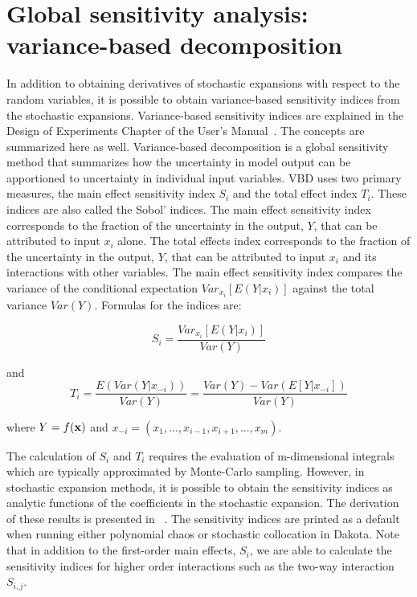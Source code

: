 \section{Global sensitivity analysis: variance-based decomposition}\label{uq:expansion:vbd}

In addition to obtaining derivatives of stochastic expansions with
respect to the random variables, it is possible to obtain
variance-based sensitivity indices from the stochastic expansions.
Variance-based sensitivity indices are explained in the Design of
Experiments Chapter of the User's Manual~\cite{UserMan}.  The concepts
are summarized here as well.  Variance-based decomposition is a global
sensitivity method that summarizes how the uncertainty in model output
can be apportioned to uncertainty in individual input variables.  VBD
uses two primary measures, the main effect sensitivity index $S_{i}$
and the total effect index $T_{i}$.  These indices are also called the
Sobol' indices. The main effect sensitivity index corresponds to the
fraction of the uncertainty in the output, $Y$, that can be attributed
to input $x_{i}$ alone.  The total effects index corresponds to the
fraction of the uncertainty in the output, $Y$, that can be attributed
to input $x_{i}$ and its interactions with other variables. The main
effect sensitivity index compares the variance of the conditional
expectation $Var_{x_{i}}[E(Y|x_{i})]$ against the total variance
$Var(Y)$.  Formulas for the indices are:

\begin{equation}
S_{i}=\frac{Var_{x_{i}}[E(Y|x_{i})]}{Var(Y)} \label{eq:sobol}
\end{equation}

and 
\begin{equation}
T_{i}=\frac{E(Var(Y|x_{-i}))}{Var(Y)}=\frac{Var(Y)-Var(E[Y|x_{-i}])}{Var(Y)}
\label{eq:total_sobol}
\end{equation}

where $Y=f({\bf x})$ and ${x_{-i}=(x_{1},...,x_{i-1},x_{i+1},...,x_{m})}$.

The calculation of $S_{i}$ and $T_{i}$ requires the evaluation of 
m-dimensional integrals which are typically approximated by Monte-Carlo 
sampling. However, in stochastic expansion methods, it is possible to 
obtain the sensitivity indices as analytic functions of the 
coefficients in the stochastic expansion.  The derivation 
of these results is presented in ~\cite{Tang10b}. The sensitivity 
indices are printed as a default when running either 
polynomial chaos or stochastic collocation in Dakota. 
Note that in addition to the first-order main effects, $S_{i}$, 
we are able to calculate the sensitivity indices for higher order 
interactions such as the two-way interaction  $S_{i,j}$.   

